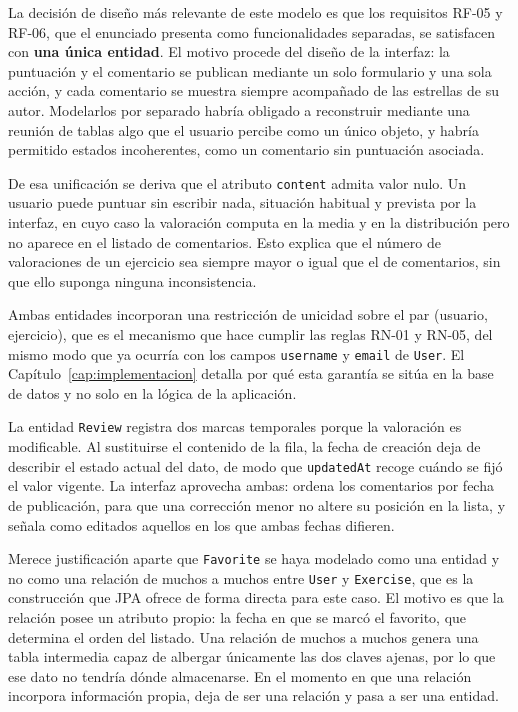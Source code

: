\documentclass[12pt,a4paper,twoside,openright]{book}
\begin{document}
    La decisión de diseño más relevante de este modelo es que los requisitos
    RF-05 y RF-06, que el enunciado presenta como funcionalidades separadas, se
    satisfacen con \textbf{una única entidad}. El motivo procede del diseño de
    la interfaz: la puntuación y el comentario se publican mediante un solo
    formulario y una sola acción, y cada comentario se muestra siempre
    acompañado de las estrellas de su autor. Modelarlos por separado habría
    obligado a reconstruir mediante una reunión de tablas algo que el usuario
    percibe como un único objeto, y habría permitido estados incoherentes, como
    un comentario sin puntuación asociada.

    De esa unificación se deriva que el atributo \texttt{content} admita valor
    nulo. Un usuario puede puntuar sin escribir nada, situación habitual y
    prevista por la interfaz, en cuyo caso la valoración computa en la media y
    en la distribución pero no aparece en el listado de comentarios. Esto
    explica que el número de valoraciones de un ejercicio sea siempre mayor o
    igual que el de comentarios, sin que ello suponga ninguna inconsistencia.

    Ambas entidades incorporan una restricción de unicidad sobre el par
    (usuario, ejercicio), que es el mecanismo que hace cumplir las reglas RN-01
    y RN-05, del mismo modo que ya ocurría con los campos \texttt{username} y
    \texttt{email} de \texttt{User}. El Capítulo~\ref{cap:implementacion} detalla
    por qué esta garantía se sitúa en la base de datos y no solo en la lógica de
    la aplicación.

    La entidad \texttt{Review} registra dos marcas temporales porque la
    valoración es modificable. Al sustituirse el contenido de la fila, la fecha
    de creación deja de describir el estado actual del dato, de modo que
    \texttt{updatedAt} recoge cuándo se fijó el valor vigente. La interfaz
    aprovecha ambas: ordena los comentarios por fecha de publicación, para que
    una corrección menor no altere su posición en la lista, y señala como
    editados aquellos en los que ambas fechas difieren.

    Merece justificación aparte que \texttt{Favorite} se haya modelado como una
    entidad y no como una relación de muchos a muchos entre \texttt{User} y
    \texttt{Exercise}, que es la construcción que JPA ofrece de forma directa
    para este caso. El motivo es que la relación posee un atributo propio: la
    fecha en que se marcó el favorito, que determina el orden del listado. Una
    relación de muchos a muchos genera una tabla intermedia capaz de albergar
    únicamente las dos claves ajenas, por lo que ese dato no tendría dónde
    almacenarse. En el momento en que una relación incorpora información
    propia, deja de ser una relación y pasa a ser una entidad.
\end{document}
